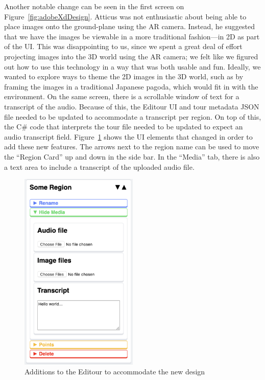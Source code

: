 \documentclass[a4paper, 10pt, american, titlepage]{article}
\begin{document}
Another notable change can be seen in the first screen on
Figure~\ref{fig:adobeXdDesign}. Atticus was not enthusiastic about being able
to place images onto the ground-plane using the AR camera. Instead, he
suggested that we have the images be viewable in a more traditional
fashion---in 2D as part of the UI. This was disappointing to us, since we spent
a great deal of effort projecting images into the 3D world using the AR camera;
we felt like we figured out how to use this technology in a way that was both
usable and fun. Ideally, we wanted to explore ways to theme the 2D images in
the 3D world, such as by framing the images in a traditional Japanese pagoda,
which would fit in with the environment. On the same screen, there is a
scrollable window of text for a transcript of the audio. Because of this, the
Editour UI and tour metadata JSON file needed to be updated to accommodate a
transcript per region. On top of this, the C\# code that interprets the tour
file needed to be updated to expect an audio transcript field.
Figure~\ref{fig:editourAdditions} shows the UI elements that changed in order
to add these new features. The arrows next to the region name can be used to
move the ``Region Card'' up and down in the side bar. In the ``Media'' tab, there
is also a text area to include a transcript of the uploaded audio file.

\begin{figure}[h]
	\centering
	\includegraphics[width=0.5\textwidth]{editour-additions.png}
	\caption[Additions to the Editour to accommodate the new design]
    {Additions to the Editour to accommodate the new design}
	\label{fig:editourAdditions}
\end{figure}
\end{document}
